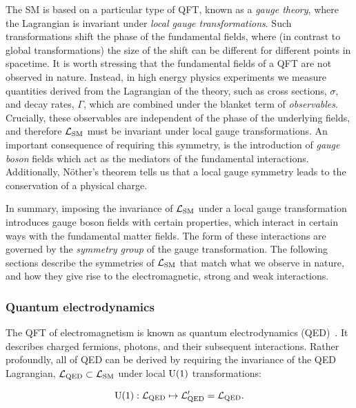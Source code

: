 The SM is based on a particular type of QFT, known as a \textit{gauge theory}, where the Lagrangian is invariant under \textit{local gauge transformations}. Such transformations shift the phase of the fundamental fields, where (in contrast to global transformations) the size of the shift can be different for different points in spacetime. 
It is worth stressing that the fundamental fields of a QFT are not observed in nature. Instead, in high energy physics experiments we measure quantities derived from the Lagrangian of the theory, such as cross sections, $\sigma$, and decay rates, $\Gamma$, which are combined under the blanket term of \textit{observables}. Crucially, these observables are independent of the phase of the underlying fields, and therefore $\mathcal{L}_{\rm{SM}}$ must be invariant under local gauge transformations. An important consequence of requiring this symmetry, is the introduction of \textit{gauge boson} fields which act as the mediators of the fundamental interactions. Additionally, N\"{o}ther's theorem tells us that a local gauge symmetry leads to the conservation of a physical charge.

In summary, imposing the invariance of $\mathcal{L}_{\rm{SM}}$ under a local gauge transformation introduces gauge boson fields with certain properties, which interact in certain ways with the fundamental matter fields. The form of these interactions are governed by the \textit{symmetry group} of the gauge transformation. The following sections describe the symmetries of $\mathcal{L}_{\rm{SM}}$ that match what we observe in nature, and how they give rise to the electromagnetic, strong and weak interactions.

\subsubsection{Quantum electrodynamics}
The QFT of electromagnetism is known as quantum electrodynamics (QED)~\cite{Aitchison:2003tq}. It describes charged fermions, photons, and their subsequent interactions. Rather profoundly, all of QED can be derived by requiring the invariance of the QED Lagrangian, $\mathcal{L}_{\rm{QED}} \subset \mathcal{L}_{\rm{SM}}$ under local ${\rm{U}}(1)$ transformations:

\begin{equation}\label{eq:u1_gaugeinvariance}
    {\rm{U}}(1): \mathcal{L}_{\rm{QED}} \mapsto \mathcal{L}'_{\rm{QED}} = \mathcal{L}_{\rm{QED}}.
\end{equation}

